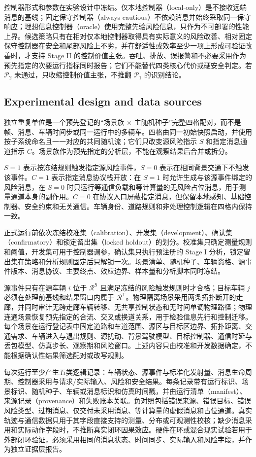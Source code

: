 \documentclass[10pt,a4paper,twocolumn]{article}
\begin{document}
控制器形式和参数在实验设计中冻结。仅本地控制器（local-only）是不接收远端消息的基线；固定保守控制器（always-cautious）不依赖消息并始终采取同一保守响应；理想信息控制器（oracle）使用完整先验风险信息，只作为不可部署的性能上界。候选策略只有在相对仅本地控制器取得具有实际意义的风险改善、相对固定保守控制器在安全和尾部风险上不劣，并在舒适性或效率至少一项上形成可验证改善时，才支持 Stage II 的控制价值主张。吞吐、排放、误报警和不必要采用作为预先指定的次要运行指标同时报告；它们不能替代四类核心代价或硬安全判定。若 $\mathcal P_2$ 未通过，只收缩控制价值主张，不推翻 $\mathcal P_1$ 的识别结论。

\subsection*{Experimental design and data sources}
独立重复单位是一个预先登记的“场景族 $\times$ 主随机种子”完整四格配对，而不是帧、消息、车辆时间步或同一运行中的多辆车。四格由同一初始快照启动，并使用按子系统命名且一一对应的共同随机流；它们只改变源风险指示 $S$ 和指定消息通道指示 $C$。场景族作为预先指定的分析层，不能在观察结果后合并或拆分。

$S=1$ 表示按冻结规则触发指定源风险事件，$S=0$ 表示在相同背景交通下不触发该事件。$C=1$ 表示指定消息协议栈开放：在 $S=1$ 时允许生成与该源事件绑定的风险消息，在 $S=0$ 时只运行等通信负载和等计算量的无风险占位消息，用于测量通道本身的副作用。$C=0$ 在协议入口屏蔽指定消息，但保留本地感知、基础控制器、安全约束和无关通信。车辆身份、道路规则和非处理控制逻辑在四格内保持一致。

正式运行前依次冻结校准集（calibration）、开发集（development）、确认集（confirmatory）和锁定留出集（locked holdout）的划分。校准集只确定测量规则和阈值，开发集可用于控制器调参，确认集只执行预注册的 Stage I 分析，锁定留出集在策略和分析规则固定后只解锁一次。场景清单、随机种子、车辆资格、源事件版本、消息协议、主要终点、效应边界、样本量和分析脚本同时冻结。

源事件只有在源车辆 $i$ 位于 $\mathcal R^{\mathsf S}$ 且满足冻结的风险触发规则时才合格；目标车辆 $j$ 必须在处理前基线和结果窗口内属于 $\mathcal R^{\mathsf T}$。物理隔离场景采用两条拓扑断开的走廊，并同时审计无跨走廊车辆转移、无共享控制状态和无时间单调物理路径；物理连通场景恢复预先指定的合流、交叉或换道关系，用于检验信息先行和控制迁移。每个场景在运行登记表中固定道路和车道范围、源区与目标区边界、拓扑距离、交通需求、车辆进入与退出规则、源扰动、背景驾驶模型、目标控制器、通信时延与丢包模型、仿真步长、观察期和风险窗口。上述内容只由校准和开发数据确定，不能根据确认性结果筛选配对或改写规则。

每次运行至少产生五类逻辑记录：车辆状态、源事件与标准化发射量、消息生命周期、控制器采用与请求/实际输入、风险和安全结果。每条记录带有运行标识、场景标识、随机种子、车辆或消息标识和仿真时间戳，并由运行清单（manifest）、来源记录（provenance）和失败账本关联。负对照包括错误来源、错误目标、错误风险类型、过期消息、仅交付未采用消息、等计算量的虚假消息和占位通道。真实轨迹与通信数据只用于其字段直接支持的测量、分布或可观测性校核\cite{ngsim2016dataset,coifman2017ngsim,barmpounakis2020pneuma,pneuma2024dataset,spmd2014dataset,zhan2019interaction}；缺少消息采用和实际动作字段时，不推断真实闭环因果效应。硬件在环或混合现实试验若用于外部闭环验证，必须采用相同的消息状态、时间同步、实际输入和风险字段，并作为独立证据层报告。
\end{document}
